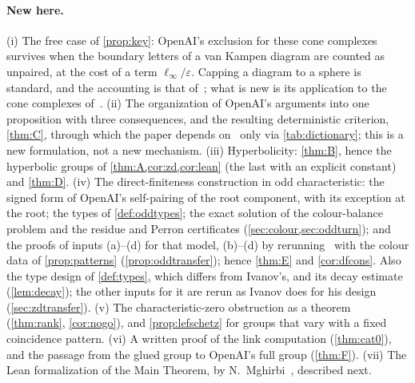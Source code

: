 \documentclass[11pt]{article}
\theoremstyle{definition}
\theoremstyle{plain}
\newcommand{\eps}{\varepsilon}
\begin{document}
\paragraph{New here.} (i) The free case of \cref{prop:key}: OpenAI's exclusion for these cone complexes survives when the boundary letters of a van Kampen diagram are counted as unpaired, at the cost of a term $\ell_\infty/\eps$. Capping a diagram to a sphere is standard, and the accounting is that of~\cite[Thm.~3.1]{OAI257}; what is new is its application to the cone complexes of~\cite{OAI196,OAI197a}. (ii) The organization of OpenAI's arguments into one proposition with three consequences, and the resulting deterministic criterion, \cref{thm:C}, through which the paper depends on~\cite{OAI196,OAI197a} only via \cref{tab:dictionary}; this is a new formulation, not a new mechanism. (iii) Hyperbolicity: \cref{thm:B}, hence the hyperbolic groups of \cref{thm:A,cor:zd,cor:lean} (the last with an explicit constant) and \cref{thm:D}. (iv) The direct-finiteness construction in odd characteristic: the signed form of OpenAI's self-pairing of the root component, with its exception at the root; the types of \cref{def:oddtypes}; the exact solution of the colour-balance problem and the residue and Perron certificates (\cref{sec:colour,sec:oddturn}); and the proofs of inputs (a)--(d) for that model, (b)--(d) by rerunning~\cite{OAI197a} with the colour data of \cref{prop:patterns} (\cref{prop:oddtransfer}); hence \cref{thm:E} and \cref{cor:dfcons}. Also the type design of \cref{def:types}, which differs from Ivanov's, and its decay estimate (\cref{lem:decay}); the other inputs for it are rerun as Ivanov does for his design (\cref{sec:zdtransfer}). (v) The characteristic-zero obstruction as a theorem (\cref{thm:rank}, \cref{cor:nogo}), and \cref{prop:lefschetz} for groups that vary with a fixed coincidence pattern. (vi) A written proof of the link computation (\cref{thm:cat0}), and the passage from the glued group to OpenAI's full group (\cref{thm:F}). (vii) The Lean formalization of the Main Theorem, by N.~Mghirbi~\cite{MghirbiLean}, described next.
\end{document}
